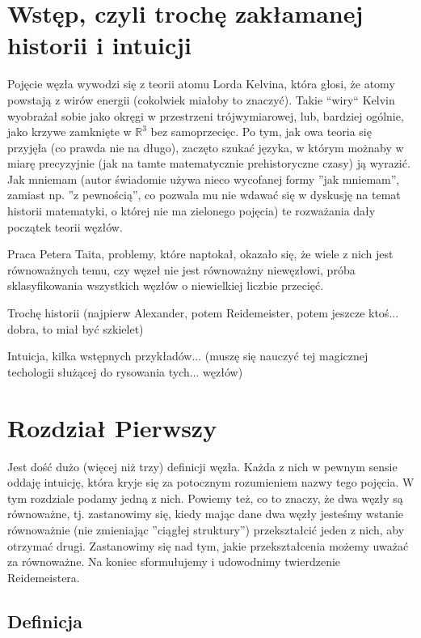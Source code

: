 \section{Wstęp, czyli trochę zakłamanej historii i intuicji}
Pojęcie węzła wywodzi się z teorii atomu Lorda Kelvina, która głosi, że atomy powstają z wirów energii (cokolwiek miałoby to znaczyć). Takie ``wiry`` Kelvin 
wyobrażał sobie jako okręgi w przestrzeni trójwymiarowej, lub, bardziej ogólnie, jako krzywe zamknięte w $\mathbb{R}^3$ bez samoprzecięc. Po tym, jak owa teoria się przyjęła 
(co prawda nie na długo), zaczęto szukać języka, w którym możnaby w miarę precyzyjnie (jak na tamte matematycznie prehistoryczne czasy) ją wyrazić. Jak mniemam (autor świadomie
używa nieco wycofanej formy ''jak mniemam'', zamiast np. ''z pewnością'', co pozwala mu nie wdawać się w dyskusję na temat historii matematyki, o której nie ma zielonego pojęcia)
te rozważania dały początek teorii węzłów. 

Praca Petera Taita, problemy, które naptokał, okazało się, że wiele z nich jest równoważnych temu, czy węzeł nie jest równoważny niewęzłowi, próba sklasyfikowania wszystkich 
węzłów o niewielkiej liczbie przecięć.

Trochę historii (najpierw Alexander, potem Reidemeister, potem jeszcze ktoś... dobra, to miał być szkielet)

Intuicja, kilka wstępnych przykładów... (muszę się nauczyć tej magicznej techologii służącej do rysowania tych... węzłów)

\section{Rozdział Pierwszy}
 
Jest dość dużo (więcej niż trzy) definicji węzła. Każda z nich w pewnym sensie oddaję intuicję, która kryje się za potocznym rozumieniem nazwy tego pojęcia. W tym rozdziale podamy
jedną z nich.
Powiemy też, co to znaczy, że dwa węzły są równoważne, tj. zastanowimy się, kiedy mając dane dwa węzły jesteśmy wstanie równoważnie (nie zmieniając ''ciągłej struktury'')
przekształcić jeden z nich, aby otrzymać drugi. Zastanowimy się nad tym, jakie przekształcenia możemy uważać za równoważne. Na koniec sformułujemy i udowodnimy
twierdzenie Reidemeistera.
 
\subsection{Definicja}
 
